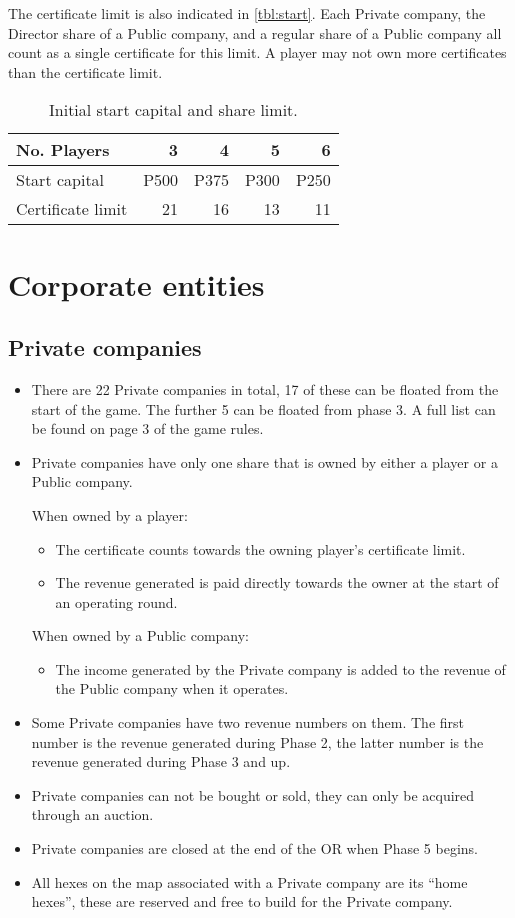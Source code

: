 \documentclass[a4paper]{article}
\begin{document}
The certificate limit is also indicated in \autoref{tbl:start}. Each Private
company, the Director share of a Public company, and a regular share of a Public
company all count as a single certificate for this limit. A player may not own
more certificates than the certificate limit.

\begin{table}
	\centering
	\caption{Initial start capital and share limit.}
	\label{tbl:start}
	\begin{tabular}{l|r|r|r|r}
	No. Players & 3 & 4 & 5 & 6 \\ \hline
	Start capital & P500 & P375 & P300 & P250 \\
	Certificate limit & 21 & 16 & 13 & 11 \\
	\end{tabular}
\end{table}

\section{Corporate entities}
\subsection{Private companies}
\begin{itemize}
	\item There are 22 Private companies in total, 17 of these can be floated
	from the start of the game. The further 5 can be floated from phase 3. A
	full list can be found on page 3 of the game rules.
	\item Private companies have only one share that is owned by either a player
	or a Public company.
	
	When owned by a player:
	\begin{itemize}
		\item The certificate counts towards the owning player's certificate
		limit.
		\item The revenue generated is paid directly towards the owner at the
		start of an operating round.
	\end{itemize}
	When owned by a Public company:
	\begin{itemize}
		\item The income generated by the Private company is added to the
		revenue of the Public company when it operates.
	\end{itemize}
	
	\item Some Private companies have two revenue numbers on them. The first
	number is the revenue generated during Phase 2, the latter number is the
	revenue generated during Phase 3 and up.
	\item Private companies can not be bought or sold, they can only be acquired
	through an auction.
	\item Private companies are closed at the end of the OR when Phase 5 begins.
	\item All hexes on the map associated with a Private company are its ``home
	hexes'', these are reserved and free to build for the Private company.
\end{itemize}
\end{document}

